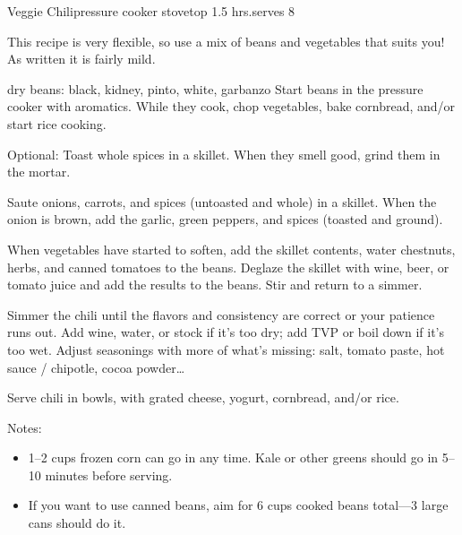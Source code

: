 \begin{recipe}{Veggie Chili}{pressure cooker \hfill stovetop \hfill 1.5 hrs.}{serves 8}

 \freeform This recipe is very flexible, so use a mix of beans and vegetables that suits you! As written it is fairly mild.

  {dry beans: black, kidney, pinto, white, garbanzo}
 Start beans in the pressure cooker with aromatics. While they cook, chop vegetables, bake cornbread, and/or start rice cooking.

 Optional: Toast whole spices in a skillet. When they smell good, grind them in the mortar.

 Saute onions, carrots, and spices (untoasted and whole) in a skillet. When the onion is brown, add the garlic, green peppers, and spices (toasted and ground).

 When vegetables have started to soften, add the skillet contents, water chestnuts, herbs, and canned tomatoes to the beans. Deglaze the skillet with wine, beer, or tomato juice and add the results to the beans. Stir and return to a simmer.

 Simmer the chili until the flavors and consistency are correct or your patience runs out. Add wine, water, or stock if it's too dry; add TVP or boil down if it's too wet. Adjust seasonings with more of what's missing: salt, tomato paste, hot sauce / chipotle, cocoa powder\dots

 \newstep Serve chili in bowls, with grated cheese, yogurt, cornbread, and/or rice.

 \freeform Notes:
 \begin{itemize}
  \item 1--2 cups frozen corn can go in any time. Kale or other greens should go in 5--10 minutes before serving.
  \item If you want to use canned beans, aim for 6 cups cooked beans total---3 large cans should do it.
 \end{itemize}
\end{recipe}
